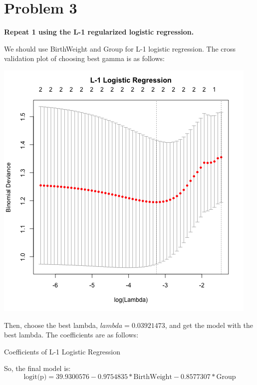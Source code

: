 \documentclass[10pt,letterpaper]{article}
\begin{document}
\section*{Problem 3}
\textbf{Repeat 1 using the L-1 regularized logistic regression.}

We should use BirthWeight and Group for L-1 logistic regression. The cross validation plot of choosing best gamma is as follows:
\begin{center}
\includegraphics[scale=0.7]{cv_l1log}
\end{center}
Then, choose the best lambda, $lambda=0.03921473$, and get the model with the best lambda. The coefficients are as follows:
\begin{center}
Coefficients of L-1 Logistic Regression

\end{center}
So, the final model is:
\[\text{logit(p)} = 39.9300576-0.9754835*\text{BirthWeight}-0.8577307*\text{Group}\]
\end{document}
